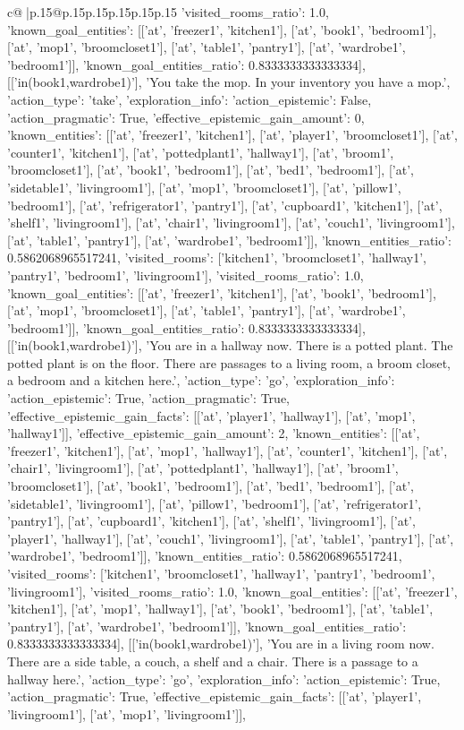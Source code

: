 \documentclass{article}
\begin{document}
{\begin{supertabular}{c@{$\;$}|p{.15\linewidth}@{}p{.15\linewidth}p{.15\linewidth}p{.15\linewidth}p{.15\linewidth}p{.15\linewidth}}
{{{'visited_rooms_ratio': 1.0, 'known_goal_entities': [['at', 'freezer1', 'kitchen1'], ['at', 'book1', 'bedroom1'], ['at', 'mop1', 'broomcloset1'], ['at', 'table1', 'pantry1'], ['at', 'wardrobe1', 'bedroom1']], 'known_goal_entities_ratio': 0.8333333333333334}}], [['in(book1,wardrobe1)'], 'You take the mop. In your inventory you have a mop.', {'action_type': 'take', 'exploration_info': {'action_epistemic': False, 'action_pragmatic': True, 'effective_epistemic_gain_amount': 0, 'known_entities': [['at', 'freezer1', 'kitchen1'], ['at', 'player1', 'broomcloset1'], ['at', 'counter1', 'kitchen1'], ['at', 'pottedplant1', 'hallway1'], ['at', 'broom1', 'broomcloset1'], ['at', 'book1', 'bedroom1'], ['at', 'bed1', 'bedroom1'], ['at', 'sidetable1', 'livingroom1'], ['at', 'mop1', 'broomcloset1'], ['at', 'pillow1', 'bedroom1'], ['at', 'refrigerator1', 'pantry1'], ['at', 'cupboard1', 'kitchen1'], ['at', 'shelf1', 'livingroom1'], ['at', 'chair1', 'livingroom1'], ['at', 'couch1', 'livingroom1'], ['at', 'table1', 'pantry1'], ['at', 'wardrobe1', 'bedroom1']], 'known_entities_ratio': 0.5862068965517241, 'visited_rooms': ['kitchen1', 'broomcloset1', 'hallway1', 'pantry1', 'bedroom1', 'livingroom1'], 'visited_rooms_ratio': 1.0, 'known_goal_entities': [['at', 'freezer1', 'kitchen1'], ['at', 'book1', 'bedroom1'], ['at', 'mop1', 'broomcloset1'], ['at', 'table1', 'pantry1'], ['at', 'wardrobe1', 'bedroom1']], 'known_goal_entities_ratio': 0.8333333333333334}}], [['in(book1,wardrobe1)'], 'You are in a hallway now. There is a potted plant. The potted plant is on the floor. There are passages to a living room, a broom closet, a bedroom and a kitchen here.', {'action_type': 'go', 'exploration_info': {'action_epistemic': True, 'action_pragmatic': True, 'effective_epistemic_gain_facts': [['at', 'player1', 'hallway1'], ['at', 'mop1', 'hallway1']], 'effective_epistemic_gain_amount': 2, 'known_entities': [['at', 'freezer1', 'kitchen1'], ['at', 'mop1', 'hallway1'], ['at', 'counter1', 'kitchen1'], ['at', 'chair1', 'livingroom1'], ['at', 'pottedplant1', 'hallway1'], ['at', 'broom1', 'broomcloset1'], ['at', 'book1', 'bedroom1'], ['at', 'bed1', 'bedroom1'], ['at', 'sidetable1', 'livingroom1'], ['at', 'pillow1', 'bedroom1'], ['at', 'refrigerator1', 'pantry1'], ['at', 'cupboard1', 'kitchen1'], ['at', 'shelf1', 'livingroom1'], ['at', 'player1', 'hallway1'], ['at', 'couch1', 'livingroom1'], ['at', 'table1', 'pantry1'], ['at', 'wardrobe1', 'bedroom1']], 'known_entities_ratio': 0.5862068965517241, 'visited_rooms': ['kitchen1', 'broomcloset1', 'hallway1', 'pantry1', 'bedroom1', 'livingroom1'], 'visited_rooms_ratio': 1.0, 'known_goal_entities': [['at', 'freezer1', 'kitchen1'], ['at', 'mop1', 'hallway1'], ['at', 'book1', 'bedroom1'], ['at', 'table1', 'pantry1'], ['at', 'wardrobe1', 'bedroom1']], 'known_goal_entities_ratio': 0.8333333333333334}}], [['in(book1,wardrobe1)'], 'You are in a living room now. There are a side table, a couch, a shelf and a chair. There is a passage to a hallway here.', {'action_type': 'go', 'exploration_info': {'action_epistemic': True, 'action_pragmatic': True, 'effective_epistemic_gain_facts': [['at', 'player1', 'livingroom1'], ['at', 'mop1', 'livingroom1']], }}}
\end{supertabular}}
\end{document}
